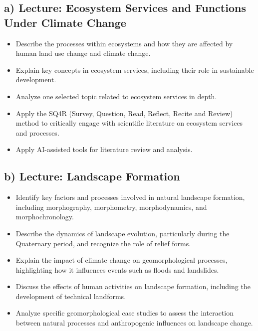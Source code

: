 \documentclass[
  letterpaper,
  10pt,
  openany]{book}
\providecommand{\tightlist}{%
  \setlength{\itemsep}{0pt}\setlength{\parskip}{0pt}}\usepackage{longtable,booktabs,array}
\begin{document}

\subsection*{a) Lecture: Ecosystem Services and Functions Under Climate
Change}\label{a-lecture-ecosystem-services-and-functions-under-climate-change-1}

\begin{itemize}
\tightlist
\item
  Describe the processes within ecosystems and how they are affected by
  human land use change and climate change.
\item
  Explain key concepts in ecosystem services, including their role in
  sustainable development.
\item
  Analyze one selected topic related to ecosystem services in depth.
\item
  Apply the SQ4R (Survey, Question, Read, Reflect, Recite and Review)
  method to critically engage with scientific literature on ecosystem
  services and processes.
\item
  Apply AI-assisted tools for literature review and analysis.
\end{itemize}

\subsection*{b) Lecture: Landscape
Formation}\label{b-lecture-landscape-formation-1}

\begin{itemize}
\tightlist
\item
  Identify key factors and processes involved in natural landscape
  formation, including morphography, morphometry, morphodynamics, and
  morphochronology.
\item
  Describe the dynamics of landscape evolution, particularly during the
  Quaternary period, and recognize the role of relief forms.
\item
  Explain the impact of climate change on geomorphological processes,
  highlighting how it influences events such as floods and landslides.
\item
  Discuss the effects of human activities on landscape formation,
  including the development of technical landforms.
\item
  Analyze specific geomorphological case studies to assess the
  interaction between natural processes and anthropogenic influences on
  landscape change.
\end{itemize}
\end{document}
